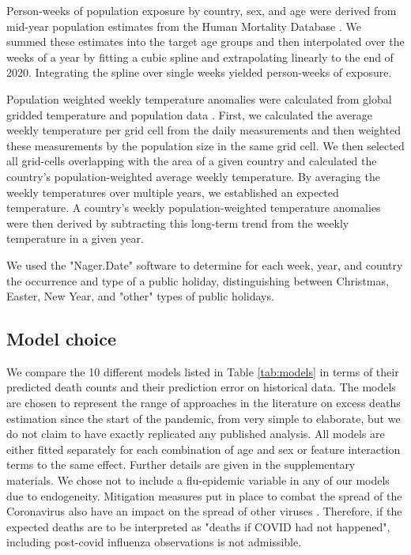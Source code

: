 \documentclass[12pt]{article}
\begin{document}

Person-weeks of population exposure by country, sex, and age were derived from mid-year population estimates from the Human Mortality Database \citep{HMD2021}. We summed these estimates into the target age groups and then interpolated over the weeks of a year by fitting a cubic spline and extrapolating linearly to the end of 2020. Integrating the spline over single weeks yielded person-weeks of exposure.


Population weighted weekly temperature anomalies were calculated from global gridded temperature \citep{CPC2021} and population data \citep{CIESIN2018}. First, we calculated the average weekly temperature per grid cell from the daily measurements and then weighted these measurements by the population size in the same grid cell. We then selected all grid-cells overlapping with the area of a given country and calculated the country's population-weighted average weekly temperature. By averaging the weekly temperatures over multiple years, we established an expected temperature. A country's weekly population-weighted temperature anomalies were then derived by subtracting this long-term trend from the weekly temperature in a given year.


We used the "Nager.Date" software \citep{Hager2021} to determine for each week, year, and country the occurrence and type of a public holiday, distinguishing between Christmas, Easter, New Year, and "other" types of public holidays.

\subsection*{Model choice}

We compare the 10 different models listed in Table \ref{tab:models} in terms of their predicted death counts and their prediction error on historical data. The models are chosen to represent the range of approaches in the literature on excess deaths estimation since the start of the pandemic, from very simple to elaborate, but we do not claim to have exactly replicated any published analysis. All models are either fitted separately for each combination of age and sex or feature interaction terms to the same effect. Further details are given in the supplementary materials. We chose not to include a flu-epidemic variable in any of our models due to endogeneity. Mitigation measures put in place to combat the spread of the Coronavirus also have an impact on the spread of other viruses \citep{Cowling2020, Soo2020}. Therefore, if the expected deaths are to be interpreted as "deaths if COVID had not happened", including post-covid influenza observations is not admissible.
\end{document}
